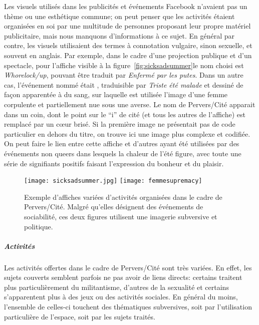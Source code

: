 Les visuels utilisés dans les publicités et événements Facebook n'avaient pas un thème ou une esthétique commune; on peut penser que les activités étaient organisées en soi par une multitude de personnes proposant leur propre matériel publicitaire, mais nous manquons d'informations à ce sujet.
En général par contre, les visuels utilisaient des termes à connotation vulgaire, sinon sexuelle, et souvent en anglais.
Par exemple, dans le cadre d'une projection publique et d'un spectacle, pour l'affiche visible à la figure~\ref{fig:sicksadsummer}le nom choisi est \emph{Whorelock/up}, pouvant être traduit par \emph{Enfermé par les putes}.
Dans un autre cas, l'événement nommé était , traduisible par \emph{Triste été malade} et dessiné de façon apparentée à du sang, sur laquelle est utilisée l'image d'une femme corpulente et partiellement nue sous une averse.
Le nom de Pervers/Cité apparait dans un coin, dont le point sur le \enquote{i} de cité (et tous les autres de l'affiche) est remplacé par un cœur brisé.
Si la première image ne présentait pas de code particulier en dehors du titre, on trouve ici une image plus complexe et codifiée.
On peut faire le lien entre cette affiche et d'autres ayant été utilisées par des événements non queers dans lesquels la chaleur de l'été figure, avec toute une série de signifiants positifs faisant l'expression du bonheur et du plaisir.

\begin{figure}[ht]
  \centering
  {\texttt{[image: sicksadsummer.jpg]}}
  {\texttt{[image: femmesupremacy]}}
  \caption[Exemples d'affiches de Pervers/Cité]{Exemple d'affiches variées d'activités organisées dans le cadre de Pervers/Cité. Malgré qu'elles désignent des événements de sociabilité, ces deux figures utilisent une imagerie subversive et politique.}\label{figs:activiteespervscite}
\end{figure}

\subparagraph{Activités}
\label{subsec:activitesperverscite}
Les activités offertes dans le cadre de Pervers/Cité sont très variées.
En effet, les sujets couverts semblent parfois ne pas avoir de liens directs: certains traitent plus particulièrement du militantisme, d'autres de la sexualité et certains s'apparentent plus à des jeux ou des activités sociales.
En général du moins, l'ensemble de celles-ci touchent des thématiques subversives, soit par l'utilisation particulière de l'espace, soit par les sujets traités.

